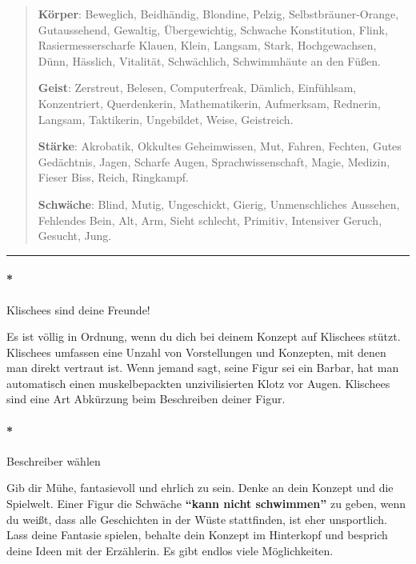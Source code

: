 \documentclass[]{article}
\let\oldparagraph\paragraph
\renewcommand{\paragraph}[1]{\oldparagraph{#1}\mbox{}}
\begin{document}
\begin{quote}
\textbf{Körper}: Beweglich, Beidhändig, Blondine, Pelzig,
Selbstbräuner-Orange, Gutaussehend, Gewaltig, Übergewichtig, Schwache
Konstitution, Flink, Rasiermesserscharfe Klauen, Klein, Langsam, Stark,
Hochgewachsen, Dünn, Hässlich, Vitalität, Schwächlich, Schwimmhäute an
den Füßen.

\textbf{Geist}: Zerstreut, Belesen, Computerfreak, Dämlich, Einfühlsam,
Konzentriert, Querdenkerin, Mathematikerin, Aufmerksam, Rednerin,
Langsam, Taktikerin, Ungebildet, Weise, Geistreich.

\textbf{Stärke}: Akrobatik, Okkultes Geheimwissen, Mut, Fahren, Fechten,
Gutes Gedächtnis, Jagen, Scharfe Augen, Sprachwissenschaft, Magie,
Medizin, Fieser Biss, Reich, Ringkampf.

\textbf{Schwäche}: Blind, Mutig, Ungeschickt, Gierig, Unmenschliches
Aussehen, Fehlendes Bein, Alt, Arm, Sieht schlecht, Primitiv, Intensiver
Geruch, Gesucht, Jung.
\end{quote}

\begin{center}\rule{0.5\linewidth}{\linethickness}\end{center}

\columnsbegin

\paragraph*{Klischees sind deine
Freunde!}\label{klischees-sind-deine-freunde}

Es ist völlig in Ordnung, wenn du dich bei deinem Konzept auf Klischees
stützt. Klischees umfassen eine Unzahl von Vorstellungen und Konzepten,
mit denen man direkt vertraut ist. Wenn jemand sagt, seine Figur sei ein
Barbar, hat man automatisch einen muskelbepackten unzivilisierten Klotz
vor Augen. Klischees sind eine Art Abkürzung beim Beschreiben deiner
Figur.

\paragraph*{Beschreiber wählen}\label{beschreiber-wuxe4hlen}

Gib dir Mühe, fantasievoll und ehrlich zu sein. Denke an dein Konzept
und die Spielwelt. Einer Figur die Schwäche \textbf{``kann nicht
schwimmen''} zu geben, wenn du weißt, dass alle Geschichten in der Wüste
stattfinden, ist eher unsportlich. Lass deine Fantasie spielen, behalte
dein Konzept im Hinterkopf und besprich deine Ideen mit der Erzählerin.
Es gibt endlos viele Möglichkeiten.
\end{document}
